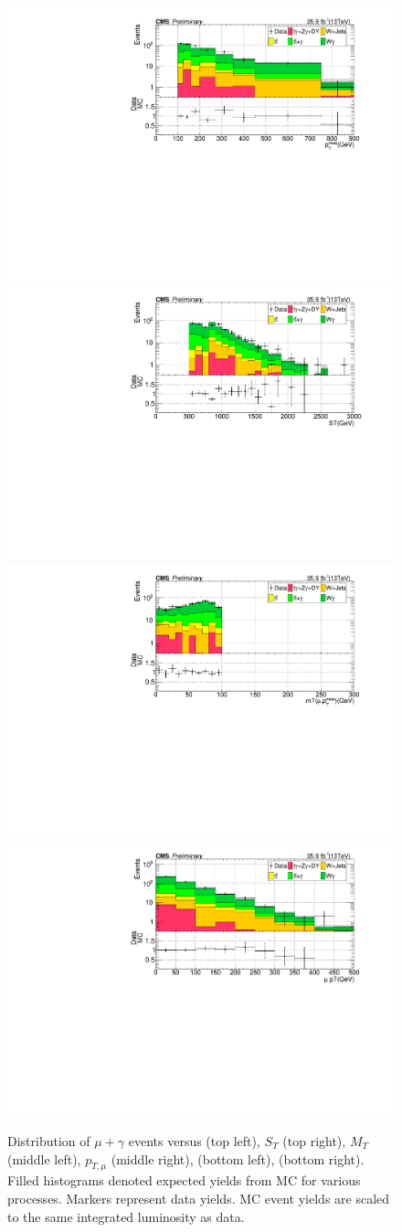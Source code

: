 \begin{figure}[h!]
\centering
\caption{Distribution of $\mu+\gamma$ events versus \ptmiss (top left), $S_T$ (top right), 
$M_T$ (middle left), $p_{T,\mu}$ (middle right), \nj (bottom left), \nb (bottom right).  
Filled histograms denoted expected yields from MC for various processes.  Markers represent data yields.
MC event yields are scaled to the same integrated luminosity as data.}
\label{fig:lost_mu_CR_dist}
\includegraphics[width=0.48\linewidth]{../Figures/Chap3/lost_lepton/METvarBin_Mu1.pdf}
\includegraphics[width=0.48\linewidth]{../Figures/Chap3/lost_lepton/ST_Mu1.pdf}\\
\includegraphics[width=0.48\linewidth]{../Figures/Chap3/lost_lepton/MT_Mu.pdf}
\includegraphics[width=0.48\linewidth]{../Figures/Chap3/lost_lepton/MuPt.pdf}\\

\end{figure}
